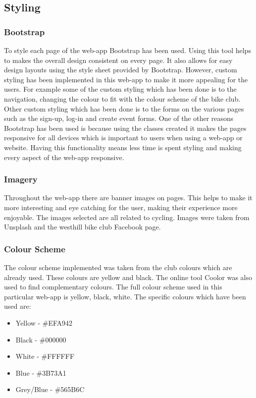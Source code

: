 \documentclass[10pt, a4paper]{article}
\begin{document}
	\subsection{Styling}
    \subsubsection{Bootstrap}
    To style each page of the web-app Bootstrap has been used. Using this tool helps to makes the overall design consistent on every page. It also allows for easy design layouts using the style sheet provided by Bootstrap. However, custom styling has been implemented in this web-app to make it more appealing for the users. For example some of the custom styling which has been done is to the navigation, changing the colour to fit with the colour scheme of the bike club. Other custom styling which has been done is to the forms on the various pages such as the sign-up, log-in and create event forms. One of the other reasons Bootstrap has been used is because using the classes created it makes the pages responsive for all devices which is important to users when using a web-app or website. Having this functionality means less time is spent styling and making every aspect of the web-app responsive.

    \subsubsection{Imagery}
    Throughout the web-app there are banner images on pages. This helps to make it more interesting and eye catching for the user, making their experience more enjoyable. The images selected are all related to cycling. Images were taken from Unsplash\cite{Unsplash} and the westhill bike club Facebook page\cite{Facebook}.  
 
	\subsubsection{Colour Scheme}
    The colour scheme implemented was taken from the club colours which are already used. These colours are yellow and black. The online tool Coolor \cite{Color} was also used to find complementary colours. The full colour scheme used in this particular web-app is yellow, black, white. The specific colours which have been used are: \begin{itemize}
        \item Yellow - \#EFA942
        \item Black - \#000000
        \item White - \#FFFFFF
        \item Blue - \#3B73A1
        \item Grey/Blue - \#565B6C
        \end{itemize}
\end{document}
